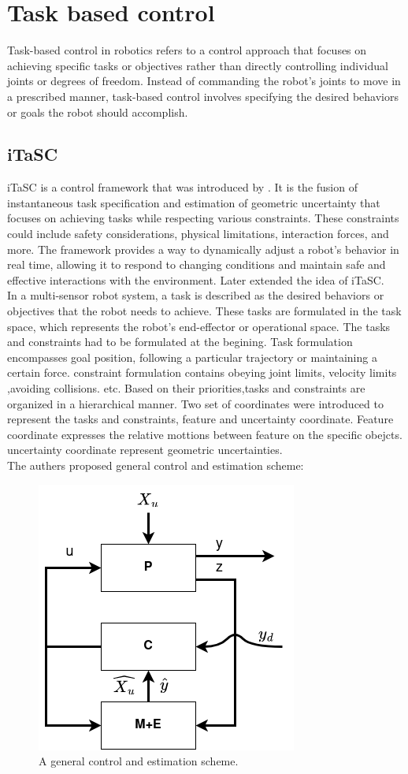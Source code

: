 \documentclass[report.tex]{subfiles}
\begin{document}
    \section{Task based control}
    Task-based control in robotics refers to a control approach that focuses on achieving specific tasks or objectives rather than directly controlling individual joints or degrees of freedom. Instead of commanding the robot's joints to move in a prescribed manner, task-based control involves specifying the desired behaviors or goals the robot should accomplish.
    \subsection{iTaSC}
    iTaSC is a control framework that was introduced by \cite{smits2008itasc}. It is the fusion of instantaneous task specification and estimation of geometric uncertainty that focuses on achieving tasks while respecting various constraints. These constraints could include safety considerations, physical limitations, interaction forces, and more. The framework provides a way to dynamically adjust a robot's behavior in real time, allowing it to respond to changing conditions and maintain safe and effective interactions with the environment. Later \cite{decre2009extending} extended the idea of iTaSC.\\
    In a multi-sensor robot system, a task is described as the desired behaviors or objectives that the robot needs to achieve. These tasks are formulated in the task space, which represents the robot's end-effector or operational space. The tasks and constraints had to be formulated at the begining. Task formulation encompasses goal position, following a particular trajectory or maintaining a certain force. constraint formulation contains obeying joint limits, velocity limits ,avoiding collisions. etc. Based on their priorities,tasks and constraints are organized in a hierarchical manner. Two set of coordinates were introduced to represent the tasks and constraints, feature and uncertainty coordinate. Feature coordinate expresses the relative mottions between feature on the specific obejcts. uncertainty coordinate represent geometric uncertainties.\\
    The authers proposed general control and estimation scheme:
    \begin{figure}[h!]
        \centering
        \includegraphics[width=0.4\linewidth]{images/iTaSC.png}
        \caption{A general control and estimation scheme.\cite{smits2008itasc}}
        \label{fig:itasc}
    \end{figure}
\end{document}
